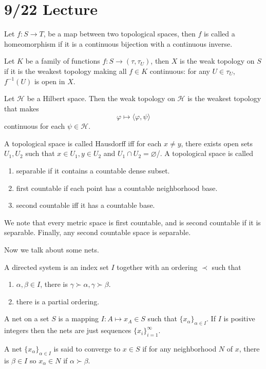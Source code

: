 \documentclass[openany]{book}
\newcommand{\la}{\langle}
\newcommand{\ra}{\rangle}
\begin{document}
\section{9/22 Lecture}
\begin{defn}[homeomorphism]
    Let $f:S\to T$, be a map between two topological spaces, then $f$ is called a homeomorphism if it is a continuous bijection with a continuous inverse.
\end{defn}

\begin{defn}
    Let $K$ be a family of functions $f: S\to (\tau, \tau_U)$, then $X$ is the weak topology on $S$ if it is the weakest topology making all $f\in K$ continuous: for any $U\in \tau_U$, $f^{-1}(U)$ is open in $X$. 
\end{defn}

\begin{example}
    Let $\mathcal{H}$ be a Hilbert space. Then the weak topology on $\mathcal{H}$ is the weakest topology that makes 
    \begin{equation*}
        \varphi\mapsto\la\varphi,\psi\ra
    \end{equation*} 
    continuous for each $\psi\in\mathcal{H}$.
\end{example}



\begin{defn}[Hausdorff]
    A topological space is called Hausdorff iff for each $x\neq y$, there exists open sets $U_1, U_2$ such that $x\in U_1, y\in U_2$ and $U_1\cap U_2=\varnothing$/. A topological space is called 
    \begin{enumerate}
        \item separable if it contains a countable dense subset.
        \item first countable if each point has a countable neighborhood base. 
        \item second countable iff it has a countable base.
    \end{enumerate}
    We note that every metric space is first countable, and is second countable if it is separable. Finally, any second countable space is separable.
\end{defn}


Now we talk about some nets.
\begin{defn}
    A directed system is an index set $I$ together with an ordering $\prec$ such that 
    \begin{enumerate}
        \item $\alpha,\beta\in I$, there is $\gamma\succ\alpha, \gamma\succ\beta$.
        \item there is a partial ordering.
    \end{enumerate}
    A net on a set $S$ is a mapping $I: A\mapsto x_A\in S$ such that $\{x_\alpha\}_{\alpha\in I}$. If $I$ is positive integers then the nets are just sequences $\{x_i\}_{i=1}^\infty$.

    A net $\{x_\alpha\}_{\alpha\in I}$ is said to converge to $x\in S$ if for any neighborhood $N$ of $x$, there is $\beta\in I$ so $x_\alpha\in N$ if $\alpha\succ\beta$.
\end{defn}
\end{document}
